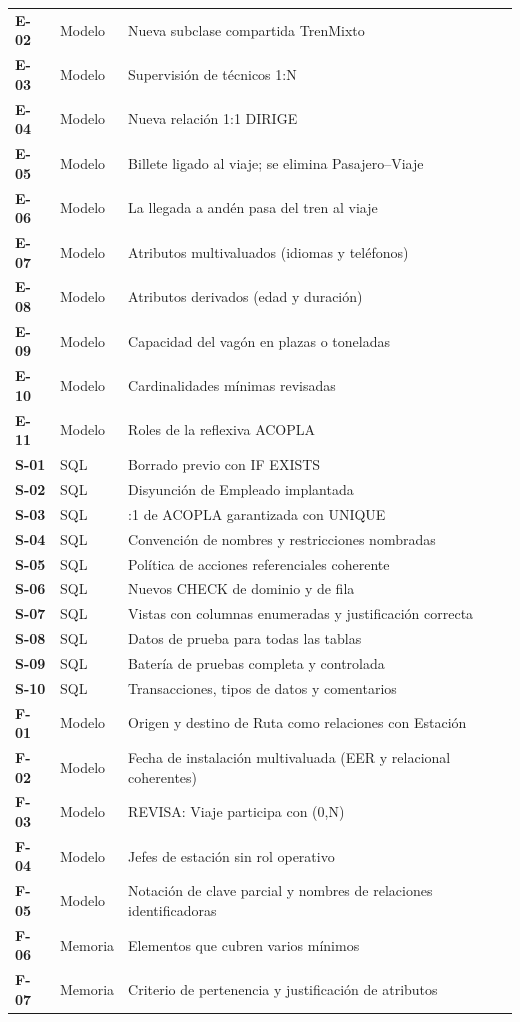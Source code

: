 \documentclass[11pt,a4paper]{article}
\DeclareRobustCommand{\_}{\textunderscore\allowbreak}
\begin{document}
{\begin{longtable}{@{}>{\bfseries}p{1.1cm} >{\raggedright\arraybackslash}p{2.6cm} >{\raggedright\arraybackslash}p{10.6cm}@{}}
E-02 & Modelo & Nueva subclase compartida Tren\_Mixto \\
E-03 & Modelo & Supervisión de técnicos 1:N \\
E-04 & Modelo & Nueva relación 1:1 DIRIGE \\
E-05 & Modelo & Billete ligado al viaje; se elimina Pasajero–Viaje \\
E-06 & Modelo & La llegada a andén pasa del tren al viaje \\
E-07 & Modelo & Atributos multivaluados (idiomas y teléfonos) \\
E-08 & Modelo & Atributos derivados (edad y duración) \\
E-09 & Modelo & Capacidad del vagón en plazas o toneladas \\
E-10 & Modelo & Cardinalidades mínimas revisadas \\
E-11 & Modelo & Roles de la reflexiva ACOPLA \\
\midrule
S-01 & SQL & Borrado previo con IF EXISTS \\
S-02 & SQL & Disyunción de Empleado implantada \\
S-03 & SQL & 1:1 de ACOPLA garantizada con UNIQUE \\
S-04 & SQL & Convención de nombres y restricciones nombradas \\
S-05 & SQL & Política de acciones referenciales coherente \\
S-06 & SQL & Nuevos CHECK de dominio y de fila \\
S-07 & SQL & Vistas con columnas enumeradas y justificación correcta \\
S-08 & SQL & Datos de prueba para todas las tablas \\
S-09 & SQL & Batería de pruebas completa y controlada \\
S-10 & SQL & Transacciones, tipos de datos y comentarios \\
\midrule
F-01 & Modelo & Origen y destino de Ruta como relaciones con Estación \\
F-02 & Modelo & Fecha de instalación multivaluada (EER y relacional coherentes) \\
F-03 & Modelo & REVISA: Viaje participa con (0,N) \\
F-04 & Modelo & Jefes de estación sin rol operativo \\
F-05 & Modelo & Notación de clave parcial y nombres de relaciones identificadoras \\
F-06 & Memoria & Elementos que cubren varios mínimos \\
F-07 & Memoria & Criterio de pertenencia y justificación de atributos \\

\end{longtable}}
\end{document}
